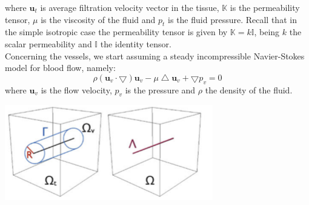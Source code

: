\documentclass[a4paper]{report}
\begin{document}
where $\mathbf{u}_{t}$ is average filtration velocity vector in the tissue, $\boldsymbol{\mathbb{K}}$ is the permeability tensor, $\mu$ is the viscosity of the fluid and $p_{t}$ is the fluid pressure. Recall that in the simple isotropic case the permeability tensor is given by $\boldsymbol{\mathbb{K}}=k\boldsymbol{\mathbb{I}}$, being $ k$ the scalar permeability and $\boldsymbol{\mathbb{I}}$ the identity tensor. \\

\indent Concerning  the vessels, we start assuming a steady incompressible Navier-Stokes model for blood flow, namely:
\begin{equation}
\rho (\mathbf{u}_{v}\cdot \bigtriangledown)\mathbf{u}_{v} - \mu \bigtriangleup\mathbf{u}_{v} +\bigtriangledown p_{v} =0
\end{equation}
where $\mathbf{u}_{v}$ is the flow velocity, $p_{v}$ is the pressure and $\rho$ the density of the fluid.
		\begin{center}
			\includegraphics[scale=1]{domain}
		\end{center}
\end{document}
